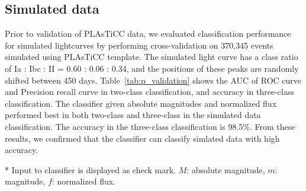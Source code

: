 \documentclass[useamsfonts]{pasj01}
\begin{document}
\subsection{Simulated data}
%
Prior to validation of PLAsTiCC data, we evaluated classification performance for simulated lightcurves by performing cross-validation on 370,345 events simulated using PLAsTiCC template.
The simulated light curve has a class ratio of Ia : Ibc : II = 0.60 : 0.06 : 0.34, and the positions of these peaks are randomly shifted between 450 days.
Table\ \ref{tab:p_validation} shows the AUC of ROC curve and Precision recall curve in two-class classification, and accuracy in three-class classification.
The classifier given absolute magnitudes and normalized flux performed best in both two-class and three-class in the simulated data classification.
The accuracy in the three-class classification is 98.5\%.
From these results, we confirmed that the classifier can classify simlated data with high accuracy.
%
%
%
%
\begin{table}[ht]
\label{tab:p_validation}
\begin{tabnote}
* Input to classifier is displayed as check mark. $M$: absolute magnitude, $m$: magnitude, $f$: normalized flux.
\end{tabnote}
\end{table}
%
%
\end{document}

